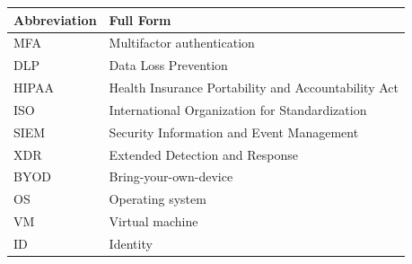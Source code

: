 \documentclass[10pt]{article}
\begin{document}
\begin{center}
\begin{tabular}{>{\raggedright\arraybackslash}p{} >{\raggedright\arraybackslash}p{}}
\toprule
\textbf{Abbreviation} & \textbf{Full Form} \\
\midrule
MFA & Multifactor authentication \\
DLP & Data Loss Prevention \\
HIPAA & Health Insurance Portability and Accountability Act \\
ISO & International Organization for Standardization \\
SIEM & Security Information and Event Management \\
XDR & Extended Detection and Response \\
BYOD & Bring-your-own-device \\
OS & Operating system \\
VM & Virtual machine \\
ID & Identity \\
\bottomrule
\end{tabular}
\end{center}
\end{document}
